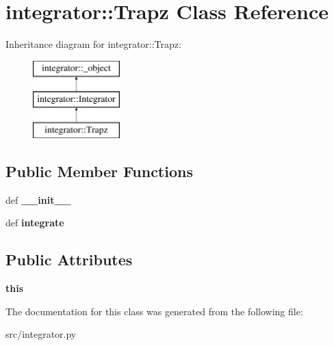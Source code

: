\hypertarget{classintegrator_1_1Trapz}{
\section{integrator::Trapz Class Reference}
\label{db/dc8/classintegrator_1_1Trapz}
}
Inheritance diagram for integrator::Trapz:\begin{figure}[H]
\begin{center}
\leavevmode
\includegraphics[height=3cm]{db/dc8/classintegrator_1_1Trapz}
\end{center}
\end{figure}
\subsection*{Public Member Functions}
\begin{DoxyCompactItemize}
\item 
\hypertarget{classintegrator_1_1Trapz_a20001d1505a9f9f5d6412e707c99a28c}{
def {\bfseries \_\-\_\-init\_\-\_\-}}
\label{db/dc8/classintegrator_1_1Trapz_a20001d1505a9f9f5d6412e707c99a28c}

\item 
\hypertarget{classintegrator_1_1Trapz_af8fade81b71ebd43ea4d8c93b7dbc490}{
def {\bfseries integrate}}
\label{db/dc8/classintegrator_1_1Trapz_af8fade81b71ebd43ea4d8c93b7dbc490}

\end{DoxyCompactItemize}
\subsection*{Public Attributes}
\begin{DoxyCompactItemize}
\item 
\hypertarget{classintegrator_1_1Trapz_a591c3fae4b831990a14bf6ac6203d599}{
{\bfseries this}}
\label{db/dc8/classintegrator_1_1Trapz_a591c3fae4b831990a14bf6ac6203d599}

\end{DoxyCompactItemize}


The documentation for this class was generated from the following file:\begin{DoxyCompactItemize}
\item 
src/integrator.py\end{DoxyCompactItemize}
